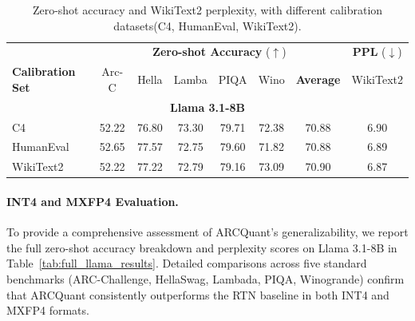 \documentclass[11pt]{article}
\begin{document}
\begin{table}[t]
\centering
\caption{Zero-shot accuracy and WikiText2 perplexity, with different calibration datasets(C4, HumanEval, WikiText2). }
\label{tab:calibration_robustness}
\begin{tabular}{l|cccccc|c}
\toprule
 & \multicolumn{6}{c|}{\textbf{Zero-shot Accuracy} ($\uparrow$)} & \textbf{PPL} ($\downarrow$) \\
\textbf{Calibration Set} & Arc-C & Hella & Lamba & PIQA & Wino & \textbf{Average} & WikiText2 \\
\midrule
\multicolumn{8}{c}{\textbf{Llama 3.1-8B}} \\
\midrule
C4         & 52.22 & 76.80 & 73.30 & 79.71 & 72.38 & 70.88 & 6.90 \\
HumanEval  & 52.65 & 77.57 & 72.75 & 79.60 & 71.82 & 70.88 & 6.89 \\
WikiText2       & 52.22 & 77.22 & 72.79 & 79.16 & 73.09 & 70.90 & 6.87 \\
\bottomrule
\end{tabular}
\end{table}

\paragraph{INT4 and MXFP4 Evaluation.} 
To provide a comprehensive assessment of ARCQuant's generalizability, we report the full zero-shot accuracy breakdown and perplexity scores on Llama 3.1-8B in Table~\ref{tab:full_llama_results}. 
Detailed comparisons across five standard benchmarks (ARC-Challenge, HellaSwag, Lambada, PIQA, Winogrande) confirm that ARCQuant consistently outperforms the RTN baseline in both INT4 and MXFP4 formats.
\end{document}
